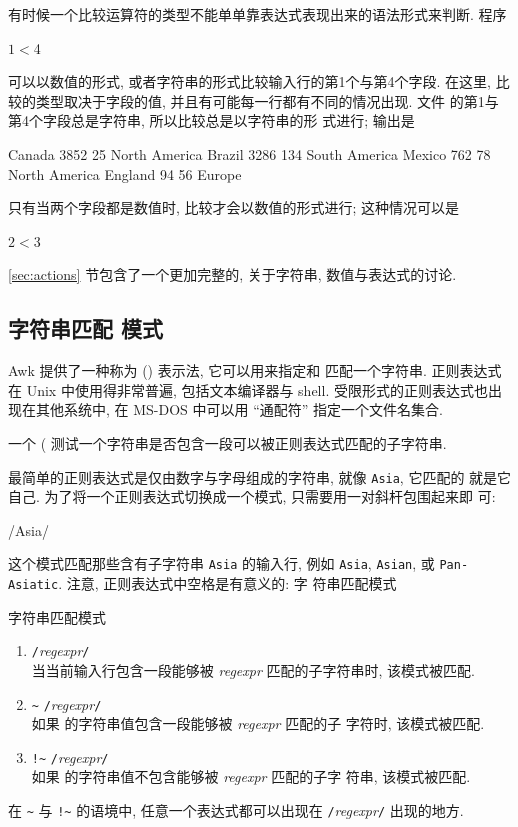 有时候一个比较运算符的类型不能单单靠表达式表现出来的语法形式来判断. 程序
\begin{awkcode}
    $1 < $4
\end{awkcode}
可以以数值的形式, 或者字符串的形式比较输入行的第1个与第4个字段. 在这里,
比较的类型取决于字段的值, 并且有可能每一行都有不同的情况出现. 文件
 的第1与第4个字段总是字符串, 所以比较总是以字符串的形
式进行; 输出是
\begin{file}
    Canada	3852	25	North America
    Brazil	3286	134	South America
    Mexico	762	78	North America
    England	94	56	Europe
\end{file}
只有当两个字段都是数值时, 比较才会以数值的形式进行; 这种情况可以是
\begin{awkcode}
    $2 < $3
\end{awkcode}

\ref{sec:actions} 节包含了一个更加完整的, 关于字符串, 数值与表达式的讨论.

\subsection{字符串匹配 模式}
\label{subsec:string_matching_pattern}

Awk 提供了一种称为  (\regexpr) 表示法, 它可以用来指定和
匹配一个字符串.  正则表达式 在 Unix 中使用得非常普遍, 包括文本编译器与
shell. 受限形式的正则表达式也出现在其他系统中, 在 MS-DOS 中可以用
``通配符'' 指定一个文件名集合.

一个  (
测试一个字符串是否包含一段可以被正则表达式匹配的子字符串.

最简单的正则表达式是仅由数字与字母组成的字符串, 就像 \verb'Asia', 它匹配的
就是它自己. 为了将一个正则表达式切换成一个模式, 只需要用一对斜杆包围起来即
可:
\begin{awkcode}
    /Asia/
\end{awkcode}
这个模式匹配那些含有子字符串 \verb'Asia' 的输入行, 例如 \verb'Asia',
\verb'Asian', 或 \verb'Pan-Asiatic'. 注意, 正则表达式中空格是有意义的: 字
符串匹配模式
\begin{summary}{字符串匹配模式}
    \begin{enumerate}
        \item \verb'/'\textit{regexpr}\verb'/' \\
            当当前输入行包含一段能够被 \textit{regexpr} 匹配的子字符串时,
            该模式被匹配.
        \item \regexpr \verb'~' \verb'/'\textit{regexpr}\verb'/' \\
            如果 \expr 的字符串值包含一段能够被 \textit{regexpr} 匹配的子
            字符时, 该模式被匹配.
        \item \expr \verb'!~' \verb'/'\textit{regexpr}\verb'/' \\
            如果 \expr 的字符串值不包含能够被 \textit{regexpr} 匹配的子字
            符串, 该模式被匹配.
    \end{enumerate}
    在 \verb'~' 与 \verb'!~' 的语境中, 任意一个表达式都可以出现在
    \verb'/'\textit{regexpr}\verb'/' 出现的地方.
\end{summary}

